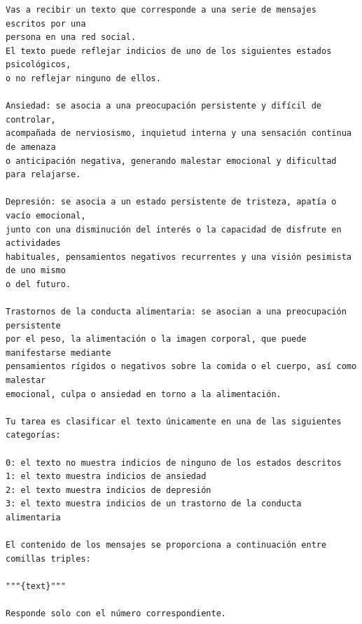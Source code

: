 \begin{lstlisting}[style=promptstyle]
Vas a recibir un texto que corresponde a una serie de mensajes escritos por una 
persona en una red social.
El texto puede reflejar indicios de uno de los siguientes estados psicológicos, 
o no reflejar ninguno de ellos.

Ansiedad: se asocia a una preocupación persistente y difícil de controlar, 
acompañada de nerviosismo, inquietud interna y una sensación continua de amenaza 
o anticipación negativa, generando malestar emocional y dificultad para relajarse.

Depresión: se asocia a un estado persistente de tristeza, apatía o vacío emocional, 
junto con una disminución del interés o la capacidad de disfrute en actividades 
habituales, pensamientos negativos recurrentes y una visión pesimista de uno mismo 
o del futuro.

Trastornos de la conducta alimentaria: se asocian a una preocupación persistente 
por el peso, la alimentación o la imagen corporal, que puede manifestarse mediante 
pensamientos rígidos o negativos sobre la comida o el cuerpo, así como malestar 
emocional, culpa o ansiedad en torno a la alimentación.

Tu tarea es clasificar el texto únicamente en una de las siguientes categorías:

0: el texto no muestra indicios de ninguno de los estados descritos
1: el texto muestra indicios de ansiedad
2: el texto muestra indicios de depresión
3: el texto muestra indicios de un trastorno de la conducta alimentaria

El contenido de los mensajes se proporciona a continuación entre comillas triples:

"""{text}"""

Responde solo con el número correspondiente.
\end{lstlisting}
